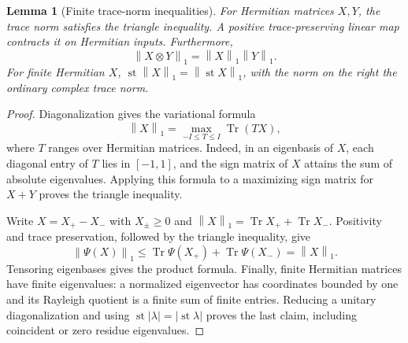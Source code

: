 \documentclass[11pt,oneside]{article}
\numberwithin{equation}{section}
\theoremstyle{plain}
\newtheorem{lemma}[theorem]{Lemma}
\theoremstyle{definition}
\theoremstyle{remark}
\newcommand{\st}{\operatorname{st}}
\newcommand{\Tr}{\operatorname{Tr}}
\newcommand{\norm}[1]{\left\|#1\right\|}
\begin{document}
\begin{lemma}[Finite trace-norm inequalities]\label{lem:tracenorm}
For Hermitian matrices $X,Y$, the trace norm satisfies the triangle inequality. A positive trace-preserving linear map contracts it on Hermitian inputs. Furthermore,
\[
 \norm{X\otimes Y}_1=\norm{X}_1\norm{Y}_1.
\]
For finite Hermitian $X$, $\st\norm{X}_1=\norm{\st X}_1$, with the norm on the right the ordinary complex trace norm.
\end{lemma}
\begin{proof}
Diagonalization gives the variational formula
\[
 \norm{X}_1=\max_{-I\le T\le I}\Tr(TX),
\]
where $T$ ranges over Hermitian matrices. Indeed, in an eigenbasis of $X$, each diagonal entry of $T$ lies in $[-1,1]$, and the sign matrix of $X$ attains the sum of absolute eigenvalues. Applying this formula to a maximizing sign matrix for $X+Y$ proves the triangle inequality.

Write $X=X_+-X_-$ with $X_\pm\ge0$ and $\norm{X}_1=\Tr X_++\Tr X_-$. Positivity and trace preservation, followed by the triangle inequality, give
\[
 \norm{\Psi(X)}_1\le\Tr\Psi(X_+)+\Tr\Psi(X_-)=\norm{X}_1.
\]
Tensoring eigenbases gives the product formula. Finally, finite Hermitian matrices have finite eigenvalues: a normalized eigenvector has coordinates bounded by one and its Rayleigh quotient is a finite sum of finite entries. Reducing a unitary diagonalization and using $\st|\lambda|=|\st\lambda|$ proves the last claim, including coincident or zero residue eigenvalues.
\end{proof}
\end{document}
